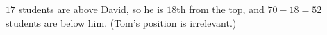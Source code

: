 $17$ students are above David, so he is $18$th from the top, and $70-18=\boxed{52}$ students are below him. (Tom's position is irrelevant.)
